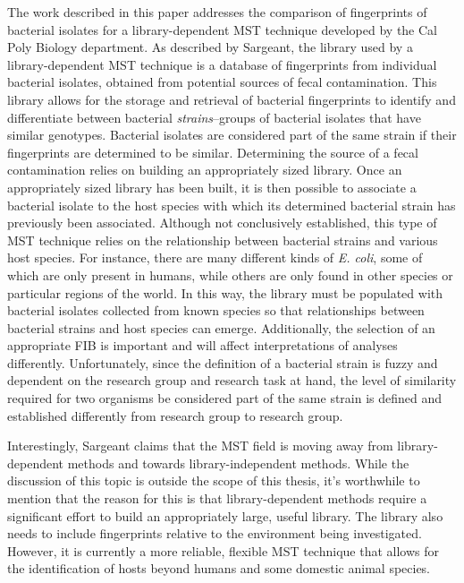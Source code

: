 \documentclass[12pt]{ucthesis}
\begin{document}
   The work described in this paper addresses the comparison of fingerprints of
   bacterial isolates for a library-dependent MST technique developed by the
   Cal Poly Biology department. As described by Sargeant, the library used by a
   library-dependent MST technique is a database of fingerprints from
   individual bacterial isolates, obtained from potential sources of fecal
   contamination. This library allows for the storage and retrieval of
   bacterial fingerprints to identify and differentiate between bacterial
   \textit{strains}--groups of bacterial isolates that have similar genotypes.
   Bacterial isolates are considered part of the same strain if their
   fingerprints are determined to be similar. Determining the source of a fecal
   contamination relies on building an appropriately sized library. Once an
   appropriately sized library has been built, it is then possible to associate
   a bacterial isolate to the host species with which its determined bacterial
   strain has previously been associated. Although not conclusively
   established, this type of MST technique relies on the relationship between
   bacterial strains and various host species. For instance, there are many
   different kinds of \textit{E. coli}, some of which are only present in
   humans, while others are only found in other species or particular regions
   of the world. In this way, the library must be populated with bacterial
   isolates collected from known species so that relationships between
   bacterial strains and host species can emerge. Additionally, the selection
   of an appropriate FIB is important and will affect interpretations of
   analyses differently. Unfortunately, since the definition of a bacterial
   strain is fuzzy and dependent on the research group and research task at
   hand, the level of similarity required for two organisms be considered part
   of the same strain is defined and established differently from research
   group to research group.

   Interestingly, Sargeant claims that the MST field is moving away from
   library-dependent methods and towards library-independent methods. While
   the discussion of this topic is outside the scope of this thesis, it's
   worthwhile to mention that the reason for this is that library-dependent
   methods require a significant effort to build an appropriately large, useful
   library. The library also needs to include fingerprints relative to the
   environment being investigated. However, it is currently a more reliable,
   flexible MST technique that allows for the identification of hosts beyond
   humans and some domestic animal species.
\end{document}
